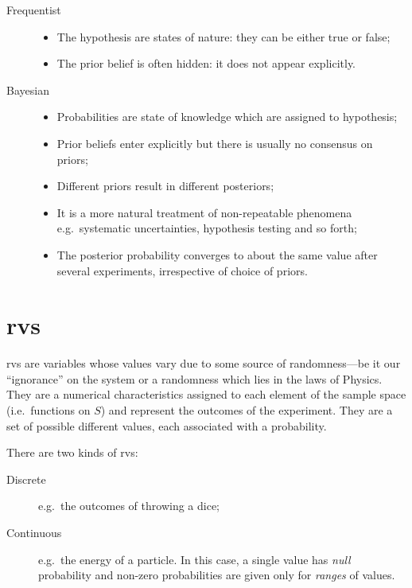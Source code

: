 \begin{description}
	\item[Frequentist]
		\begin{itemize}
			\item
				The hypothesis are states of nature: they can be either true or false;
			\item
				The prior belief is often hidden: it does not appear explicitly.
		\end{itemize}
	\item[Bayesian]
		\begin{itemize}
			\item
				Probabilities are state of knowledge which are assigned to hypothesis;
			\item
				Prior beliefs enter explicitly but there is usually no consensus on priors;
			\item
				Different priors result in different posteriors;
			\item
				It is a more natural treatment of non-repeatable phenomena e.g.~systematic uncertainties, hypothesis testing and so forth;
			\item
				The posterior probability converges to about the same value after several experiments, irrespective of choice of priors.
		\end{itemize}
\end{description}

\section{\aclp{rv}}

\acp{rv} are variables whose values vary due to some source of randomness---be it our ``ignorance'' on the system or a randomness which lies in the laws of Physics.
They are a numerical characteristics assigned to each element of the sample space (i.e.~functions on $S$) and represent the outcomes of the experiment.
They are a set of possible different values, each associated with a probability.

There are two kinds of \acp{rv}:
\begin{description}
	\item[Discrete] e.g.~the outcomes of throwing a dice;
	\item[Continuous] e.g.~the energy of a particle. In this case, a single value has \emph{null} probability and non-zero probabilities are given only for \emph{ranges} of values.
\end{description}

